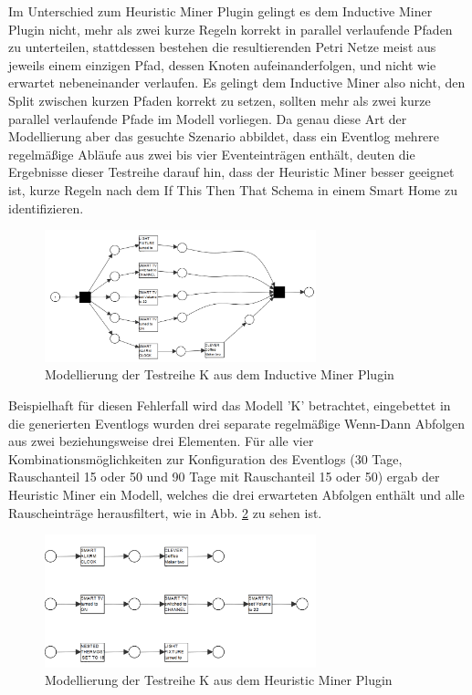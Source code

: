 Im Unterschied zum Heuristic Miner Plugin gelingt es dem Inductive Miner Plugin nicht, mehr als zwei kurze Regeln korrekt in parallel verlaufende Pfaden zu unterteilen, stattdessen bestehen die resultierenden Petri Netze meist aus jeweils einem einzigen Pfad, dessen Knoten aufeinanderfolgen, und nicht wie erwartet nebeneinander verlaufen. Es gelingt dem Inductive Miner also nicht, den Split zwischen kurzen Pfaden korrekt zu setzen, sollten mehr als zwei kurze parallel verlaufende Pfade im Modell vorliegen. Da genau diese Art der Modellierung aber das gesuchte Szenario abbildet, dass ein Eventlog mehrere regelmäßige Abläufe aus zwei bis vier Eventeinträgen enthält, deuten die Ergebnisse dieser Testreihe darauf hin, dass der Heuristic Miner besser geeignet ist, kurze Regeln nach dem If This Then That Schema in einem Smart Home zu identifizieren.
\begin{figure}[!ht]
    \centering
    \includegraphics[width=0.7\textwidth,]{figures/Appbildungen/K_inductive_erronousPNG.PNG}
    \caption{Modellierung der Testreihe K aus dem Inductive Miner Plugin}
    \label{fig:K_inductive}
\end{figure}
Beispielhaft für diesen Fehlerfall wird das Modell 'K' betrachtet, eingebettet in die generierten Eventlogs wurden drei separate regelmäßige Wenn-Dann Abfolgen aus zwei beziehungsweise drei Elementen. Für alle vier Kombinationsmöglichkeiten zur Konfiguration des Eventlogs (30 Tage, Rauschanteil 15 oder 50 und 90 Tage mit Rauschanteil 15 oder 50) ergab der Heuristic Miner ein Modell, welches die drei erwarteten Abfolgen enthält und alle Rauscheinträge herausfiltert, wie in Abb. \ref{fig:K_heuristic} zu sehen ist.
\begin{figure}[!h]
    \centering
    \includegraphics[width=0.7\textwidth,]{figures/Appbildungen/K_heuristic_correct.PNG}
    \caption{Modellierung der Testreihe K aus dem Heuristic Miner Plugin}
    \label{fig:K_heuristic}
\end{figure}
